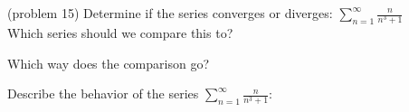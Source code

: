 \documentclass[handout]{ximera}
\begin{document}
\begin{problem}(problem 15)
Determine if the series converges or diverges: $\displaystyle{\sum_{n=1}^\infty \frac{n}{n^3 + 1}}$\\
Which series should we compare this to?

\begin{multipleChoice}
\end{multipleChoice}

Which way does the comparison go?
\begin{multipleChoice}
\end{multipleChoice}

Describe the behavior of the series $\sum_{n=1}^\infty \frac{n}{n^3 + 1}:$
\begin{multipleChoice}
\end{multipleChoice}

\end{problem}
\end{document}
